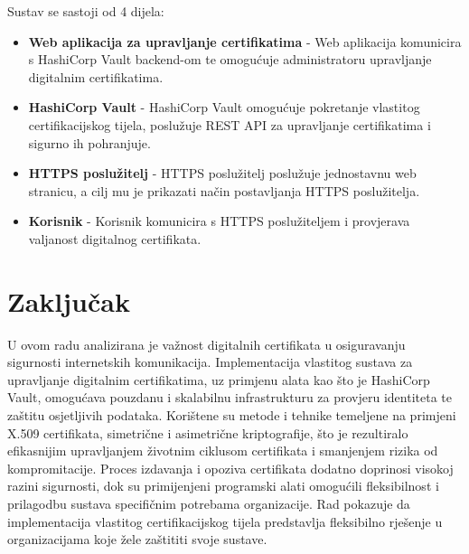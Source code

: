 \documentclass[]{foi}
\begin{document}
Sustav se sastoji od 4 dijela:
\begin{itemize}
    \item \textbf{Web aplikacija za upravljanje certifikatima} - Web aplikacija komunicira s HashiCorp Vault backend-om te omogućuje administratoru upravljanje digitalnim certifikatima.
    \item \textbf{HashiCorp Vault} - HashiCorp Vault omogućuje pokretanje vlastitog certifikacijskog tijela,
          poslužuje REST API za upravljanje certifikatima i sigurno ih pohranjuje.
    \item \textbf{HTTPS poslužitelj} - HTTPS poslužitelj poslužuje jednostavnu web stranicu, a cilj mu je prikazati način postavljanja
          HTTPS poslužitelja.
    \item \textbf{Korisnik} - Korisnik komunicira s HTTPS poslužiteljem i provjerava valjanost digitalnog certifikata.
\end{itemize}

\chapter{Zaključak}

U ovom radu analizirana je važnost digitalnih certifikata u osiguravanju sigurnosti internetskih komunikacija.
Implementacija vlastitog sustava za upravljanje digitalnim certifikatima, uz primjenu alata kao što je HashiCorp Vault,
omogućava pouzdanu i skalabilnu infrastrukturu za provjeru identiteta te zaštitu osjetljivih podataka.
Korištene su metode i tehnike temeljene na primjeni X.509 certifikata, simetrične i asimetrične kriptografije,
što je rezultiralo efikasnijim upravljanjem životnim ciklusom certifikata i smanjenjem rizika od kompromitacije.
Proces izdavanja i opoziva certifikata dodatno doprinosi visokoj razini sigurnosti, dok su primijenjeni programski
alati omogućili fleksibilnost i prilagodbu sustava specifičnim potrebama organizacije.
Rad pokazuje da implementacija vlastitog certifikacijskog tijela predstavlja fleksibilno 
rješenje u organizacijama koje žele zaštititi svoje sustave.

\makebackmatter



\end{document}
